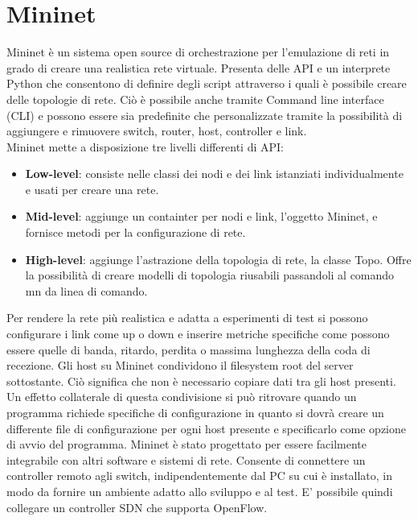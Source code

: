 \section{Mininet}
Mininet \cite{mininet} è un sistema open source di orchestrazione per l'emulazione di reti in grado di creare una realistica rete virtuale.
Presenta delle API e un interprete Python che consentono di definire degli script attraverso i quali è possibile creare delle topologie di rete.
Ciò è possibile anche tramite Command line interface (CLI)  e possono essere sia predefinite che personalizzate tramite la possibilità di 
aggiungere e rimuovere switch, router, host, controller e link.
\\Mininet mette a disposizione tre livelli differenti di API:
\begin{itemize}
\item \textbf{Low-level}: consiste nelle classi dei nodi e dei link istanziati individualmente e usati per creare una rete.
\item \textbf{Mid-level}: aggiunge un containter per nodi e link, l'oggetto Mininet, e fornisce metodi per la configurazione di rete.
\item \textbf{High-level}: aggiunge l'astrazione della topologia di rete, la classe Topo. Offre la possibilità di creare modelli di topologia riusabili passandoli al comando mn da linea di comando.
\end{itemize}
Per rendere la rete più realistica e adatta a esperimenti di test si possono configurare i link come up o down e inserire metriche specifiche 
come possono essere quelle di banda, ritardo, perdita o massima lunghezza della coda di recezione.
Gli host su Mininet condividono il filesystem root del server sottostante. 
Ciò significa che non è necessario copiare dati tra gli host presenti.
Un effetto collaterale di questa condivisione si può ritrovare quando un programma richiede specifiche di configurazione in quanto si dovrà creare un differente 
file di configurazione per ogni host presente e specificarlo come opzione di avvio del programma. 
Mininet è stato progettato per essere facilmente integrabile con altri software e sistemi di rete.
Consente di connettere un controller remoto agli switch, indipendentemente dal PC su cui è installato, in modo da fornire un ambiente adatto allo sviluppo e al test.
E' possibile quindi collegare un controller SDN che supporta OpenFlow.